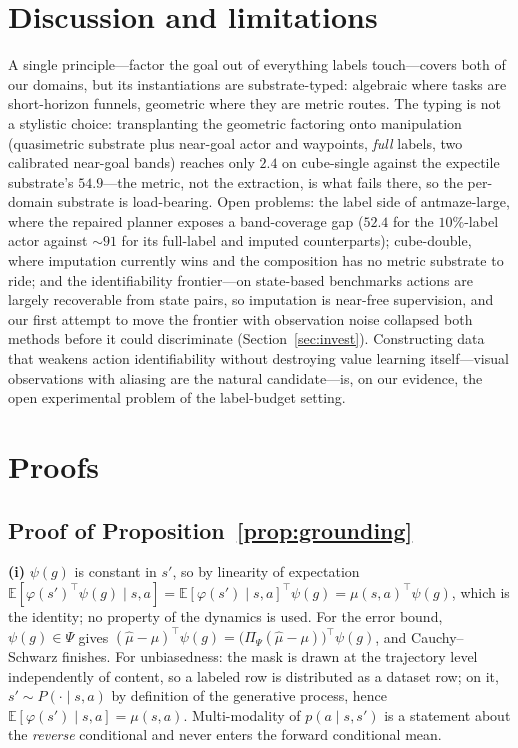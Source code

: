 \documentclass{article}
\newcommand{\E}{\mathbb{E}}
\theoremstyle{plain}
\theoremstyle{definition}
\begin{document}
\section{Discussion and limitations}
A single principle---factor the goal out of everything labels touch---covers both of our domains, but its instantiations are substrate-typed: algebraic where tasks are short-horizon funnels, geometric where they are metric routes. The typing is not a stylistic choice: transplanting the geometric factoring onto manipulation (quasimetric substrate plus near-goal actor and waypoints, \emph{full} labels, two calibrated near-goal bands) reaches only $2.4$ on cube-single against the expectile substrate's $54.9$---the metric, not the extraction, is what fails there, so the per-domain substrate is load-bearing. Open problems: the label side of antmaze-large, where the repaired planner exposes a band-coverage gap ($52.4$ for the $10\%$-label actor against ${\sim}91$ for its full-label and imputed counterparts); cube-double, where imputation currently wins and the composition has no metric substrate to ride; and the identifiability frontier---on state-based benchmarks actions are largely recoverable from state pairs, so imputation is near-free supervision, and our first attempt to move the frontier with observation noise collapsed both methods before it could discriminate (Section~\ref{sec:invest}). Constructing data that weakens action identifiability without destroying value learning itself---visual observations with aliasing are the natural candidate---is, on our evidence, the open experimental problem of the label-budget setting.




\appendix
\section{Proofs}
\label{app:proofs}

\subsection{Proof of Proposition~\ref{prop:grounding}}
\textbf{(i)} $\psi(g)$ is constant in $s'$, so by linearity of expectation
$\E[\varphi(s')^{\!\top}\psi(g)\mid s,a]=\E[\varphi(s')\mid s,a]^{\!\top}\psi(g)=\mu(s,a)^{\!\top}\psi(g)$,
which is the identity; no property of the dynamics is used. For the error bound, $\psi(g)\in\Psi$ gives
$(\hat\mu-\mu)^{\!\top}\psi(g)=\big(\Pi_\Psi(\hat\mu-\mu)\big)^{\!\top}\psi(g)$, and Cauchy--Schwarz finishes.
For unbiasedness: the mask is drawn at the trajectory level independently of content, so a labeled row is distributed as a dataset row; on it, $s'\sim P(\cdot\mid s,a)$ by definition of the generative process, hence $\E[\varphi(s')\mid s,a]=\mu(s,a)$. Multi-modality of $p(a\mid s,s')$ is a statement about the \emph{reverse} conditional and never enters the forward conditional mean.
\end{document}
